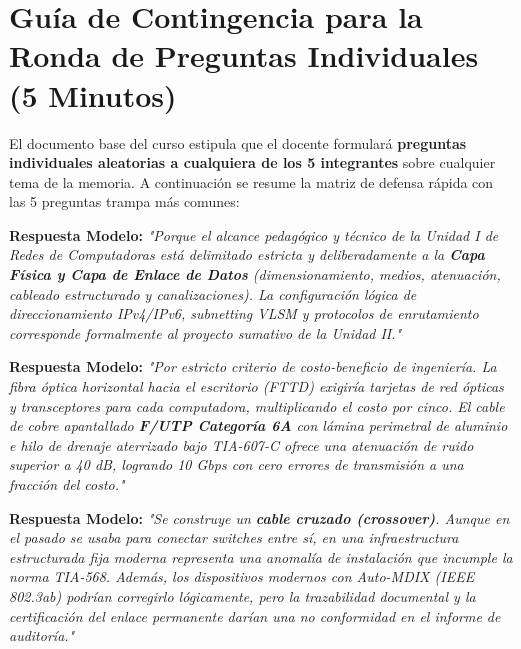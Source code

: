 \documentclass[11pt,a4paper]{article}
\begin{document}
\newpage

\section{Guía de Contingencia para la Ronda de Preguntas Individuales (5 Minutos)}

El documento base del curso estipula que el docente formulará \textbf{preguntas individuales aleatorias a cualquiera de los 5 integrantes} sobre cualquier tema de la memoria. A continuación se resume la matriz de defensa rápida con las 5 preguntas trampa más comunes:

\begin{tcolorbox}[colback=lightgray,colframe=primaryblue,title=\textbf{Pregunta 1: ¿Por qué en este proyecto no configuraron subredes ni direcciones IP?}]
\textbf{Respuesta Modelo:} \textit{"Porque el alcance pedagógico y técnico de la Unidad I de Redes de Computadoras está delimitado estricta y deliberadamente a la \textbf{Capa Física y Capa de Enlace de Datos} (dimensionamiento, medios, atenuación, cableado estructurado y canalizaciones). La configuración lógica de direccionamiento IPv4/IPv6, subnetting VLSM y protocolos de enrutamiento corresponde formalmente al proyecto sumativo de la Unidad II."}
\end{tcolorbox}

\begin{tcolorbox}[colback=lightgray,colframe=primaryblue,title=\textbf{Pregunta 2: ¿Por qué no instalaron fibra óptica horizontal si es inmune al ruido de Rayos X?}]
\textbf{Respuesta Modelo:} \textit{"Por estricto criterio de costo-beneficio de ingeniería. La fibra óptica horizontal hacia el escritorio (FTTD) exigiría tarjetas de red ópticas y transceptores para cada computadora, multiplicando el costo por cinco. El cable de cobre apantallado \textbf{F/UTP Categoría 6A} con lámina perimetral de aluminio e hilo de drenaje aterrizado bajo TIA-607-C ofrece una atenuación de ruido superior a 40 dB, logrando 10 Gbps con cero errores de transmisión a una fracción del costo."}
\end{tcolorbox}

\begin{tcolorbox}[colback=lightgray,colframe=primaryblue,title=\textbf{Pregunta 3: ¿Qué ocurre si un técnico conecta un extremo en T568A y el otro en T568B?}]
\textbf{Respuesta Modelo:} \textit{"Se construye un \textbf{cable cruzado (crossover)}. Aunque en el pasado se usaba para conectar switches entre sí, en una infraestructura estructurada fija moderna representa una anomalía de instalación que incumple la norma TIA-568. Además, los dispositivos modernos con Auto-MDIX (IEEE 802.3ab) podrían corregirlo lógicamente, pero la trazabilidad documental y la certificación del enlace permanente darían una no conformidad en el informe de auditoría."}
\end{tcolorbox}
\end{document}
